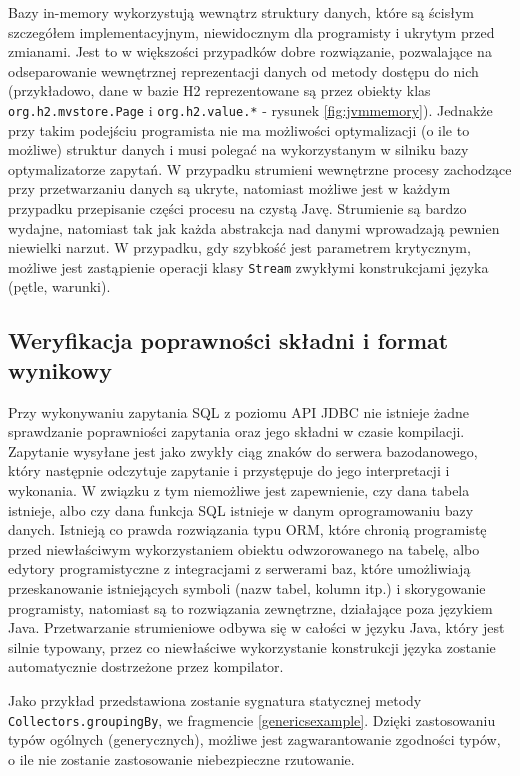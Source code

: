 \documentclass[12pt]{extarticle}
\begin{document}
    Bazy in-memory wykorzystują wewnątrz struktury danych, które są ścisłym szczegółem implementacyjnym, niewidocznym dla programisty i ukrytym przed zmianami. Jest to w większości przypadków dobre rozwiązanie, pozwalające na odseparowanie wewnętrznej reprezentacji danych od metody dostępu do nich (przykładowo, dane w bazie H2 reprezentowane są przez obiekty klas \texttt{org.h2.mvstore.Page} i \texttt{org.h2.value.*} - rysunek \ref{fig:jvmmemory}). Jednakże przy takim podejściu programista nie ma możliwości optymalizacji (o ile to możliwe) struktur danych i musi polegać na wykorzystanym w silniku bazy optymalizatorze zapytań. W przypadku strumieni wewnętrzne procesy zachodzące przy przetwarzaniu danych są ukryte, natomiast możliwe jest w każdym przypadku przepisanie części procesu na czystą Javę. Strumienie są bardzo wydajne, natomiast tak jak każda abstrakcja nad danymi wprowadzają pewnien niewielki narzut. W przypadku, gdy szybkość jest parametrem krytycznym, możliwe jest zastąpienie operacji klasy \texttt{Stream} zwykłymi konstrukcjami języka (pętle, warunki). 

\subsection{Weryfikacja poprawności składni i format wynikowy}

    Przy wykonywaniu zapytania SQL z poziomu API JDBC nie istnieje żadne sprawdzanie poprawniości zapytania oraz jego składni w czasie kompilacji. Zapytanie wysyłane jest jako zwykły ciąg znaków do serwera bazodanowego, który następnie odczytuje zapytanie i przystępuje do jego interpretacji i wykonania. W związku z tym niemożliwe jest zapewnienie, czy dana tabela istnieje, albo czy dana funkcja SQL istnieje w danym oprogramowaniu bazy danych. Istnieją co prawda rozwiązania typu ORM, które chronią programistę przed niewłaściwym wykorzystaniem obiektu odwzorowanego na tabelę, albo edytory programistyczne z integracjami z serwerami baz, które umożliwiają przeskanowanie istniejących symboli (nazw tabel, kolumn itp.) i skorygowanie programisty, natomiast są to rozwiązania zewnętrzne, działające poza językiem Java. Przetwarzanie strumieniowe odbywa się w całości w języku Java, który jest silnie typowany, przez co niewłaściwe wykorzystanie konstrukcji języka zostanie automatycznie dostrzeżone przez kompilator.
    
    Jako przykład przedstawiona zostanie sygnatura statycznej metody \texttt{Collectors.groupingBy}, we fragmencie \ref{genericsexample}. Dzięki zastosowaniu typów ogólnych \cite{generics} (generycznych), możliwe jest zagwarantowanie zgodności typów, o ile nie zostanie zastosowanie niebezpieczne rzutowanie.
\end{document}
